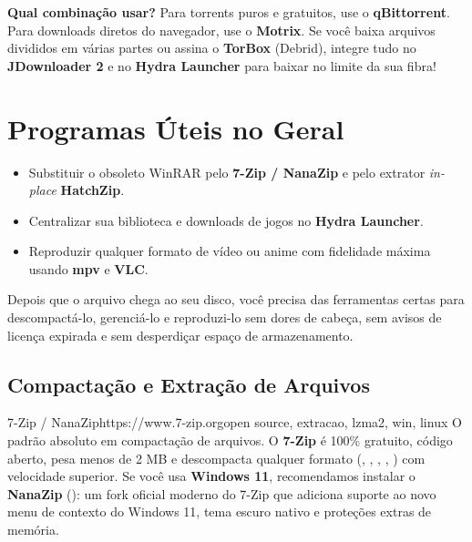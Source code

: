 \documentclass{pousadaguide}
\begin{document}
\begin{tldr}
\textbf{Qual combinação usar?} Para torrents puros e gratuitos, use o \textbf{qBittorrent}. Para downloads diretos do navegador, use o \textbf{Motrix}. Se você baixa arquivos divididos em várias partes ou assina o \textbf{TorBox} (Debrid), integre tudo no \textbf{JDownloader 2} e no \textbf{Hydra Launcher} para baixar no limite da sua fibra!
\end{tldr}

\chapter{Programas Úteis no Geral}

\begin{missao}
\begin{itemize}
  \item Substituir o obsoleto WinRAR pelo \textbf{7-Zip / NanaZip} e pelo extrator \emph{in-place} \textbf{HatchZip}.
  \item Centralizar sua biblioteca e downloads de jogos no \textbf{Hydra Launcher}.
  \item Reproduzir qualquer formato de vídeo ou anime com fidelidade máxima usando \textbf{mpv} e \textbf{VLC}.
\end{itemize}
\end{missao}

Depois que o arquivo chega ao seu disco, você precisa das ferramentas certas para descompactá-lo, gerenciá-lo e reproduzi-lo sem dores de cabeça, sem avisos de licença expirada e sem desperdiçar espaço de armazenamento.

\section{Compactação e Extração de Arquivos}

\begin{ferramenta}[goat,logo=7zip]{7-Zip / NanaZip}{https://www.7-zip.org}{open source, extracao, lzma2, win, linux}
O padrão absoluto em compactação de arquivos. O \textbf{7-Zip} é 100\% gratuito, código aberto, pesa menos de 2 MB e descompacta qualquer formato (, , , , ) com velocidade superior. Se você usa \textbf{Windows 11}, recomendamos instalar o \textbf{NanaZip} (): um fork oficial moderno do 7-Zip que adiciona suporte ao novo menu de contexto do Windows 11, tema escuro nativo e proteções extras de memória. 
\end{ferramenta}
\end{document}
